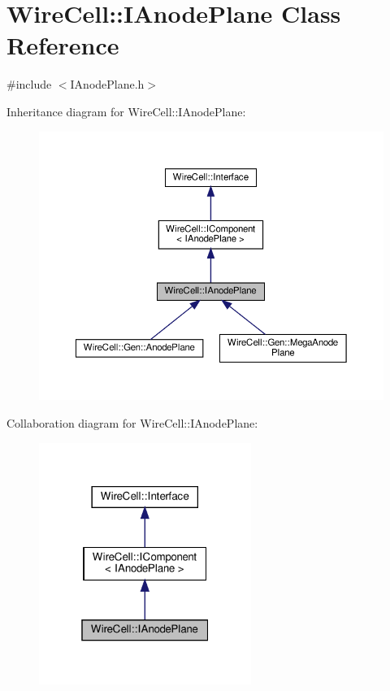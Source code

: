 \hypertarget{class_wire_cell_1_1_i_anode_plane}{}\section{Wire\+Cell\+:\+:I\+Anode\+Plane Class Reference}
\label{class_wire_cell_1_1_i_anode_plane}


{\ttfamily \#include $<$I\+Anode\+Plane.\+h$>$}



Inheritance diagram for Wire\+Cell\+:\+:I\+Anode\+Plane\+:
\nopagebreak
\begin{figure}[H]
\begin{center}
\leavevmode
\includegraphics[width=350pt]{class_wire_cell_1_1_i_anode_plane__inherit__graph}
\end{center}
\end{figure}


Collaboration diagram for Wire\+Cell\+:\+:I\+Anode\+Plane\+:
\nopagebreak
\begin{figure}[H]
\begin{center}
\leavevmode
\includegraphics[width=196pt]{class_wire_cell_1_1_i_anode_plane__coll__graph}
\end{center}
\end{figure}
